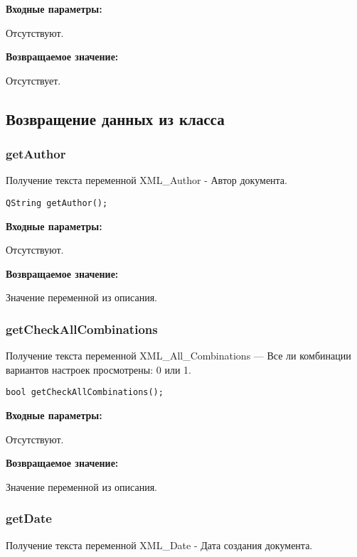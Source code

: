 \documentclass[a4paper,12pt]{article}
\begin{document}
\textbf{Входные параметры:}

Отсутствуют.

\textbf{Возвращаемое значение:}

Отсутствует.


\subsection{Возвращение данных из класса}

\subsubsection{getAuthor}\label{getAuthor}

Получение текста переменной XML\_Author - Автор документа.


\begin{lstlisting}[label=code_syntax_getAuthor,caption=Синтаксис]
QString getAuthor();
\end{lstlisting}

\textbf{Входные параметры:}

Отсутствуют.

\textbf{Возвращаемое значение:}

Значение переменной из описания.


\subsubsection{getCheckAllCombinations}\label{getCheckAllCombinations}

Получение текста переменной  XML\_All\_Combinations --- Все ли комбинации вариантов настроек просмотрены: 0 или 1.


\begin{lstlisting}[label=code_syntax_getCheckAllCombinations,caption=Синтаксис]
bool getCheckAllCombinations();
\end{lstlisting}

\textbf{Входные параметры:}

Отсутствуют.

\textbf{Возвращаемое значение:}

Значение переменной из описания.


\subsubsection{getDate}\label{getDate}

Получение текста переменной  XML\_Date - Дата создания документа.
\end{document}
